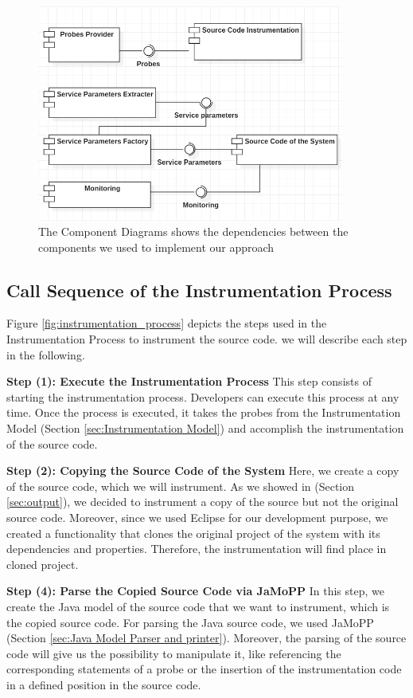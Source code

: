\begin{figure}[h]
\centering
\includegraphics[width=0.9\textwidth]{figures/architecture}
\caption{The Component Diagrams shows the dependencies between the components we used to implement our approach}
\label{fig:architecture}
\end{figure}

\subsection{Call Sequence of the Instrumentation Process}
\label{sec:Call Sequence of the Instrumentation Process}
Figure \ref{fig:instrumentation_process} depicts the steps used in the Instrumentation Process to instrument the source code. we will describe each step in the following. 

\textbf{Step (1): Execute the Instrumentation Process}
This step consists of starting the instrumentation process. Developers can execute this process at any time. Once the process is executed, it takes the probes from the Instrumentation Model (Section \ref{sec:Instrumentation Model}) and accomplish the instrumentation of the source code. 

\textbf{Step (2): Copying the Source Code of the System}
Here, we create a copy of the source code, which we will instrument. As we showed in (Section \ref{sec:output}), we decided to instrument a copy of the source but not the original source code. Moreover, since we used Eclipse for our development purpose, we created a functionality that clones the original project of the system with its dependencies and properties. Therefore, the instrumentation will find place in cloned project.  

\textbf{Step (4): Parse the Copied Source Code via JaMoPP}
In this step, we create the Java model of the source code that we want to instrument, which is the copied source code. For parsing the Java source code, we used JaMoPP (Section \ref{sec:Java Model Parser and printer}). Moreover, the parsing of the source code will give us the possibility to manipulate it, like referencing the corresponding statements of a probe or the insertion of the instrumentation code in a defined position in the source code.

